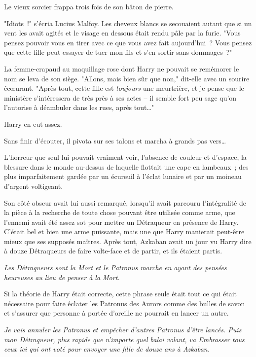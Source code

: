 Le vieux sorcier frappa trois fois de son bâton de pierre.

"Idiots~!" s'écria Lucius Malfoy. Les cheveux blancs se secouaient autant que si un vent les avait agités et le visage en dessous était rendu pâle par la furie. "Vous pensez pouvoir vous en tirer avec ce que vous avez fait aujourd'hui~? Vous pensez que cette fille peut essayer de tuer mon fils et s'en sortir sans dommages~?"

La femme-crapaud au maquillage rose dont Harry ne pouvait se remémorer le nom se leva de son siège. "Allons, mais bien sûr que non," dit-elle avec un sourire écœurant. "Après tout, cette fille est \emph{toujours} une meurtrière, et je pense que le ministère s'intéressera de très près à ses actes -- il semble fort peu sage qu'on l'autorise à déambuler dans les rues, après tout…"

Harry en eut assez.

Sans finir d'écouter, il pivota sur ses talons et marcha à grands pas vers…

L'horreur que seul lui pouvait vraiment voir, l'absence de couleur et d'espace, la blessure dans le monde au-dessus de laquelle flottait une cape en lambeaux~; des plus imparfaitement gardée par un écureuil à l'éclat lunaire et par un moineau d'argent voltigeant.

Son côté obscur avait lui aussi remarqué, lorsqu'il avait parcouru l'intégralité de la pièce à la recherche de toute chose pouvant être utilisée comme arme, que l'ennemi avait été assez sot pour mettre un Détraqueur en présence de Harry. C'était bel et bien une arme puissante, mais une que Harry manierait peut-être mieux que ses supposés maîtres. Après tout, Azkaban avait un jour vu Harry dire à douze Détraqueurs de faire volte-face et de partir, et ils étaient partis.

\emph{Les Détraqueurs sont la Mort et le Patronus marche en ayant des pensées heureuses au lieu de penser à la Mort.}

Si la théorie de Harry était correcte, cette phrase seule était tout ce qui était nécessaire pour faire éclater les Patronus des Aurors comme des bulles de savon et s'assurer que personne à portée d'oreille ne pourrait en lancer un autre.

\emph{Je vais annuler les Patronus et empêcher d'autres Patronus d'être lancés. Puis mon Détraqueur, plus rapide que n'importe quel balai volant, va Embrasser tous ceux ici qui ont voté pour envoyer une fille de douze ans à Azkaban.}


